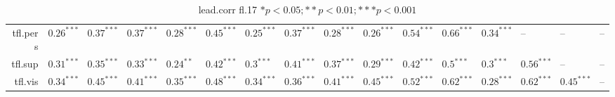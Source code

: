 \begin{table}[ht]
\begin{tabular}{rlllllllllllllll}
  tfl.pers & $0.26^{***}$ & $0.37^{***}$ & $0.37^{***}$ & $0.28^{***}$ & $0.45^{***}$ & $0.25^{***}$ & $0.37^{***}$ & $0.28^{***}$ & $0.26^{***}$ & $0.54^{***}$ & $0.66^{***}$ & $0.34^{***}$ & -- & -- & -- \\ 
  tfl.sup & $0.31^{***}$ & $0.35^{***}$ & $0.33^{***}$ & $0.24^{**}$ & $0.42^{***}$ & $0.3^{***}$ & $0.41^{***}$ & $0.37^{***}$ & $0.29^{***}$ & $0.42^{***}$ & $0.5^{***}$ & $0.3^{***}$ & $0.56^{***}$ & -- & -- \\ 
  tfl.vis & $0.34^{***}$ & $0.45^{***}$ & $0.41^{***}$ & $0.35^{***}$ & $0.48^{***}$ & $0.34^{***}$ & $0.36^{***}$ & $0.41^{***}$ & $0.45^{***}$ & $0.52^{***}$ & $0.62^{***}$ & $0.28^{***}$ & $0.62^{***}$ & $0.45^{***}$ & -- \\ 
   \hline
\end{tabular}
\caption{lead.corr fl.17 $* p < 0.05; ** p < 0.01; *** p < 0.001$} 
\label{freq_corr.lead.corr.fl.17}
\end{table}
